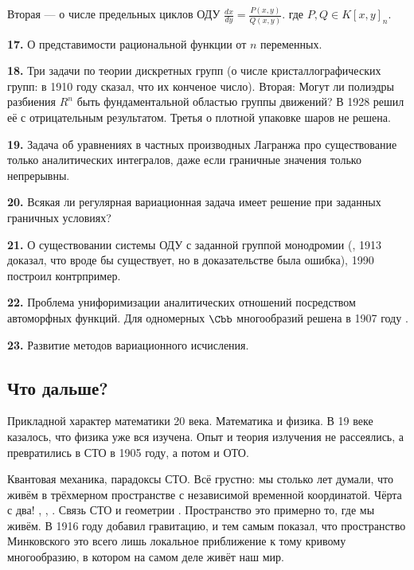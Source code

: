 \documentclass[a4paper,oneside,fleqn,10pt]{article}
\begin{document}
Вторая --- о числе предельных циклов ОДУ $\frac{dx}{dy} =
\frac{P(x,y)}{Q(x,y)}$.  где $P,Q \in K[x,y]_n$.

\medskip

\textbf{17.} О представимости рациональной функции от $n$ переменных.

\medskip

\textbf{18.} Три задачи по теории дискретных групп (о числе
кристаллографических групп:  в 1910 году сказал, что их
конченое число).  Вторая: Могут ли полиэдры разбиения $R^n$ быть
фундаментальной областью группы движений?  В 1928 
решил её с отрицательным результатом.  Третья о плотной упаковке шаров
не решена.

\medskip

\textbf{19.} Задача об уравнениях в частных производных Лагранжа про
существование только аналитических интегралов, даже если граничные
значения только непрерывны.

\medskip

\textbf{20.} Всякая ли регулярная вариационная задача имеет решение
при заданных граничных условиях?

\medskip

\textbf{21.} О существовании системы ОДУ с заданной группой монодромии
(, 1913 доказал, что вроде бы существует, но в
доказательстве была ошибка), 1990  построил
контрпример.

\medskip

\textbf{22.} Проблема унифоримизации аналитических отношений
посредством автоморфных функций. Для одномерных $\Cbb$ многообразий
решена в 1907 году .

\medskip

\textbf{23.} Развитие методов вариационного исчисления.

\subsection{Что дальше?}

Прикладной характер математики 20 века. Математика и физика.  В 19
веке казалось, что физика уже вся изучена.  Опыт
 и теория излучения не рассеялись, а
превратились в СТО в 1905 году, а потом и ОТО.

Квантовая механика, парадоксы СТО. Всё грустно: мы столько лет думали,
что живём в трёхмерном пространстве с независимой временной
координатой. Чёрта с два! , ,
.  Связь СТО и геометрии
. Пространство
 это примерно то, где мы живём.  В 1916
году  добавил гравитацию, и тем самым показал, что
пространство Минковского это всего лишь локальное приближение к тому
кривому многообразию, в котором на самом деле живёт наш мир.
\end{document}

